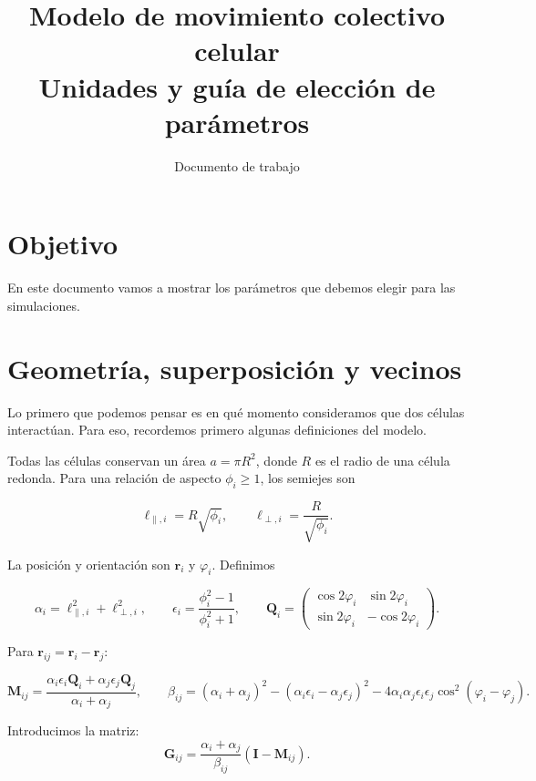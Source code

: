 \documentclass[11pt,a4paper]{article}
\title{Modelo de movimiento colectivo celular\\Unidades y guía de elección de parámetros}
\author{Documento de trabajo}
\date{}
\newcommand{\Id}{\mathbf{I}}
\begin{document}
\maketitle

\section{Objetivo}

En este documento vamos a mostrar los parámetros que debemos elegir para las simulaciones.

\section{Geometría, superposición y vecinos}

Lo primero que podemos pensar es en qué momento consideramos que dos células interactúan. Para eso, recordemos primero algunas definiciones del modelo.

Todas las células conservan un área $a=\pi R^2$, donde $R$ es el radio de una célula redonda. Para una relación de aspecto $\phi_i\geq1$, los semiejes son

\begin{equation}
 \ell_{\parallel,i}=R\sqrt{\phi_i},\qquad
 \ell_{\perp,i}=\frac{R}{\sqrt{\phi_i}}.
\end{equation}

La posición y orientación son $\bm r_i$ y $\varphi_i$. Definimos

\begin{equation}
 \alpha_i=\ell_{\parallel,i}^{2}+\ell_{\perp,i}^{2},\qquad
 \epsilon_i=\frac{\phi_i^2-1}{\phi_i^2+1},\qquad
 \bm Q_i=\begin{pmatrix}
 \cos2\varphi_i&\sin2\varphi_i\\\sin2\varphi_i&-\cos2\varphi_i
 \end{pmatrix}.
\end{equation}

Para $\bm r_{ij}=\bm r_i-\bm r_j$:

\begin{equation}
 \bm M_{ij}=\frac{\alpha_i\epsilon_i\bm Q_i+\alpha_j\epsilon_j\bm Q_j}{\alpha_i+\alpha_j},
 \qquad
 \beta_{ij}=(\alpha_i+\alpha_j)^2-(\alpha_i\epsilon_i-\alpha_j\epsilon_j)^2
 -4\alpha_i \alpha_j\epsilon_i\epsilon_j\cos^2(\varphi_i-\varphi_j).
\end{equation}

Introducimos la matriz:
\begin{equation}
 \bm G_{ij}=\frac{\alpha_i+\alpha_j}{\beta_{ij}}(\Id-\bm M_{ij}).
\end{equation}
\end{document}
